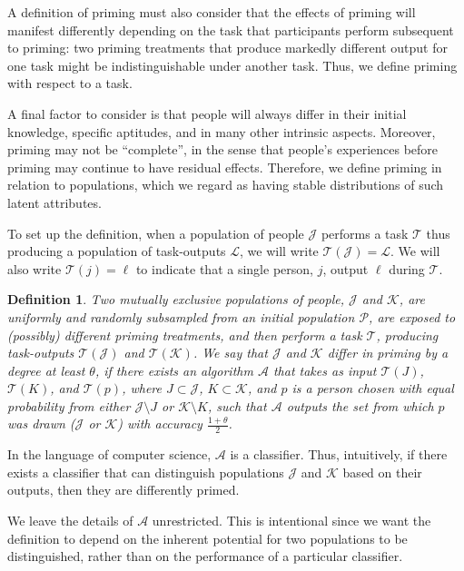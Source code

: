 \documentclass[a4paper]{report}
\newtheorem*{mydef}{Definition}
\begin{document}
A definition of priming must also consider that the effects of priming will
manifest differently depending on the task that participants perform 
subsequent to priming:  two priming treatments that
produce markedly different output for one task might be 
indistinguishable under another task.  Thus, we define priming
with respect to a task.

A final factor to consider is that people will always differ in their initial
knowledge, specific aptitudes, and in many other intrinsic aspects.  Moreover,
priming may not be ``complete'', in the sense that people's experiences before
priming may continue to have residual effects.  Therefore, we define priming 
in relation to populations, which we regard as having stable distributions of
such latent attributes.

To set up the definition, when a population of people $\mathcal{J}$ performs
a task $\mathcal{T}$ thus producing a population of task-outputs $\mathcal{L}$,
we will write $\mathcal{T}(\mathcal{J}) = \mathcal{L}$. We will also write 
$\mathcal{T}(j) = \ell$ to indicate that a single person, $j$, output $\ell$ 
during $\mathcal{T}$.

\vspace{2mm}
\begin{mydef}
	\upshape
	Two mutually exclusive populations of people, $\mathcal{J}$ and 
	$\mathcal{K}$, are uniformly and randomly subsampled from an initial 
	population $\mathcal{P}$, are exposed to (possibly) different priming 
	treatments, and then perform a task $\mathcal{T}$, 
	producing task-outputs $\mathcal{T}(\mathcal{J})$ and 
	$\mathcal{T}(\mathcal{K})$.
	We say that $\mathcal{J}$ and $\mathcal{K}$ 
	\emph{differ in priming by a degree at least $\theta$},
	if there exists an algorithm $\mathcal{A}$ that takes as input 
	$\mathcal{T}(J)$, $\mathcal{T}(K)$, and $\mathcal{T}(p)$,
	where $J \subset \mathcal{J}$, $K \subset \mathcal{K}$, and $p$ is a 
	person chosen with equal probability from either $\mathcal{J}\setminus J$ 
	or $\mathcal{K}\setminus K$, 
	such that $\mathcal{A}$ outputs the set from which $p$ was drawn
	($\mathcal{J}$ or $\mathcal{K}$) with accuracy $\frac{1+\theta}{2}$.  
\end{mydef}

In the language of computer science, $\mathcal{A}$ is a classifier.  Thus,
intuitively, if there exists a classifier that can distinguish populations 
$\mathcal{J}$ and $\mathcal{K}$ based on their outputs, then they are 
differently primed.

We leave the details of $\mathcal{A}$ unrestricted.  This is 
intentional since we want the definition to depend on the inherent 
potential for two populations to be distinguished, rather than on the 
performance of a particular classifier.
\end{document}
